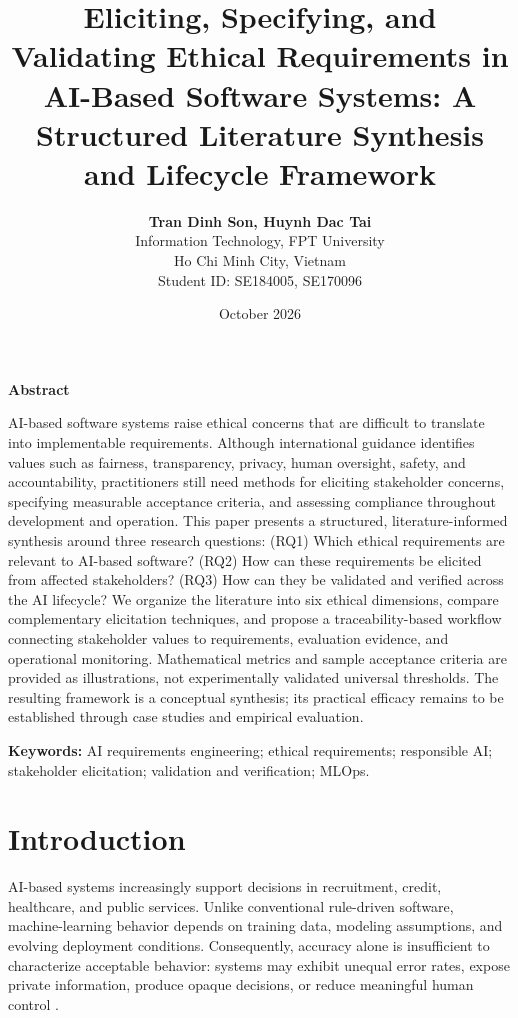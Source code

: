 \documentclass[11pt,a4paper]{article}
\title{\textbf{Eliciting, Specifying, and Validating Ethical Requirements in AI-Based Software Systems: A Structured Literature Synthesis and Lifecycle Framework}}
\author{\textbf{Tran Dinh Son, Huynh Dac Tai}\\Information Technology, FPT University\\Ho Chi Minh City, Vietnam\\Student ID: SE184005, SE170096}
\date{October 2026}
\begin{document}
\maketitle

\begin{center}
\textbf{Abstract}
\end{center}
\noindent
AI-based software systems raise ethical concerns that are difficult to translate into implementable requirements. Although international guidance identifies values such as fairness, transparency, privacy, human oversight, safety, and accountability, practitioners still need methods for eliciting stakeholder concerns, specifying measurable acceptance criteria, and assessing compliance throughout development and operation. This paper presents a structured, literature-informed synthesis around three research questions: (RQ1) Which ethical requirements are relevant to AI-based software? (RQ2) How can these requirements be elicited from affected stakeholders? (RQ3) How can they be validated and verified across the AI lifecycle? We organize the literature into six ethical dimensions, compare complementary elicitation techniques, and propose a traceability-based workflow connecting stakeholder values to requirements, evaluation evidence, and operational monitoring. Mathematical metrics and sample acceptance criteria are provided as illustrations, not experimentally validated universal thresholds. The resulting framework is a conceptual synthesis; its practical efficacy remains to be established through case studies and empirical evaluation.

\vspace{0.5em}
\noindent\textbf{Keywords:} AI requirements engineering; ethical requirements; responsible AI; stakeholder elicitation; validation and verification; MLOps.

\section{Introduction}
AI-based systems increasingly support decisions in recruitment, credit, healthcare, and public services. Unlike conventional rule-driven software, machine-learning behavior depends on training data, modeling assumptions, and evolving deployment conditions. Consequently, accuracy alone is insufficient to characterize acceptable behavior: systems may exhibit unequal error rates, expose private information, produce opaque decisions, or reduce meaningful human control \cite{floridi2018,jobin2019,mehrabi2021}.
\end{document}

